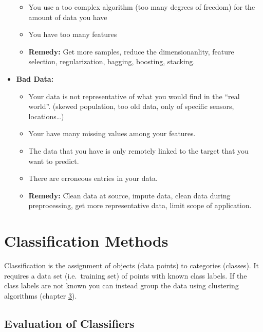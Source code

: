 \documentclass[
]{book}
\providecommand{\tightlist}{%
  \setlength{\itemsep}{0pt}\setlength{\parskip}{0pt}}
\begin{document}
\begin{itemize}
  \begin{itemize}
  \tightlist
  \item
    You use a too complex algorithm (too many degrees of freedom)
    for the amount of data you have
  \item
    You have too many features
  \item
    \textbf{Remedy:} Get more samples, reduce the dimensionanlity,
    feature selection, regularization, bagging, boosting, stacking.
  \end{itemize}
\item
  \textbf{Bad Data:}

  \begin{itemize}
  \tightlist
  \item
    Your data is not representative of what you would find in the
    ``real world''. (skewed population, too old data, only of specific
    sensors, locations\ldots)
  \item
    Your have many missing values among your features.
  \item
    The data that you have is only remotely linked to the target
    that you want to predict.
  \item
    There are erroneous entries in your data.
  \item
    \textbf{Remedy:} Clean data at source, impute data, clean data during
    preprocessing, get more representative data, limit scope of
    application.
  \end{itemize}
\end{itemize}

\hypertarget{classification-methods}{%
\chapter{Classification Methods}\label{classification-methods}}

Classification is the assignment of objects (data points) to categories
(classes). It requires a data set (i.e.~training set) of points with
known class labels. If the class labels are not known you can instead
group the data using clustering algorithms (chapter
\protect\hyperlink{Clusteringux5cux2520Methods}{3}).

\hypertarget{evaluation-of-classifiers}{%
\section{Evaluation of Classifiers}\label{evaluation-of-classifiers}}
\end{document}
